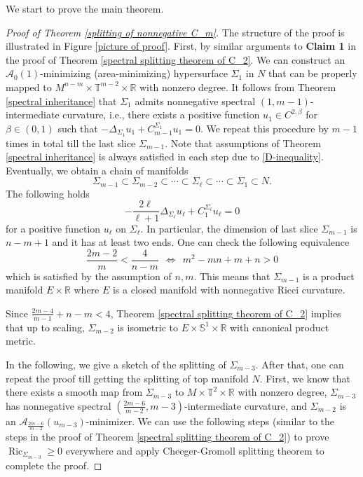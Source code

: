 \documentclass[11pt,letterpaper]{amsart}
\DeclareMathOperator{\Ric}{Ric}
\theoremstyle{definition}
\theoremstyle{remark}
\numberwithin{equation}{section}
\begin{document}
We start to prove the main theorem.
\begin{proof}[Proof of Theorem \ref{splitting of nonnegative C_m}]
    The structure of the proof is illustrated in Figure \ref{picture of proof}. First, by similar arguments to \textbf{Claim 1} in the proof of Theorem \ref{spectral splitting theorem of C_2}. We can construct an $\mathcal{A}_0(1)$-minimizing (area-minimizing) hypersurface $\Sigma_1$ in $N$ that can be properly mapped to $M^{n-m}\times \mathbb{T}^{m-2}\times \mathbb{R}$ with nonzero degree. It follows from Theorem \ref{spectral inheritance} that $\Sigma_1$ admits nonnegative spectral $(1,m-1)$-intermediate curvature, i.e., there exists a positive function $u_1\in C^{2,\beta}$ for $\beta\in (0,1)$ such that $-\Delta_{\Sigma_1}u_1+C_{m-1}^{\Sigma_1} u_1=0.$ We repeat this procedure by $m-1$ times in total till the last slice $\Sigma_{m-1}$. Note that assumptions of Theorem \ref{spectral inheritance} is always satisfied in each step due to \eqref{D-inequality}. Eventually, we obtain a chain of manifolds $$\Sigma_{m-1}\subset \Sigma_{m-2}\subset \cdots\subset \Sigma_\ell\subset \cdots \subset \Sigma_1\subset N.$$ The following holds $$-\frac{2\ell}{\ell+1}\Delta_{\Sigma_{\ell}}u_{\ell}+C_1^{\Sigma_{\ell}}u_{\ell}=0$$ for a positive function $u_{\ell}$ on $\Sigma_{\ell}$.  In particular, the dimension of last slice $\Sigma_{m-1}$ is $n-m+1$ and it has at least two ends. One can check the following equivalence
    \[\frac{2m-2}{m}<\frac{4}{n-m}\ \ \Longleftrightarrow\ \ m^2-mn+m+n>0 \]
    which is satisfied by the assumption of $n,m$. This means that $\Sigma_{m-1}$ is a product manifold $E\times \mathbb{R}$ where $E$ is a closed manifold with nonnegative Ricci curvature.

    Since 
    $\frac{2m-4}{m-1}+n-m<4$, Theorem \ref{spectral splitting theorem of C_2} implies that up to scaling, $\Sigma_{m-2}$ is isometric to $E\times \mathbb{S}^1\times \mathbb{R}$  with canonical product metric.  
    
    In the following, we give a sketch of the splitting of $\Sigma_{m-3}$. After that, one can repeat the proof till getting the splitting of top manifold $N$.
    First, we know that there exists a smooth map from $\Sigma_{m-3}$ to $M\times \mathbb{T}^2\times \mathbb{R}$ with nonzero degree, $\Sigma_{m-3}$ has nonnegative spectral $(\frac{2m-6}{m-2},m-3)$-intermediate curvature, and $\Sigma_{m-2}$ is an $\mathcal{A}_{\frac{2m-6}{m-2}}(u_{m-3})$-minimizer. We can use the following steps (similar to the steps in the proof of Theorem \ref{spectral splitting theorem of C_2}) to prove $\Ric_{\Sigma_{m-3}}\geq 0$ everywhere and apply Cheeger-Gromoll splitting theorem to complete the proof.


\end{proof}
\end{document}
